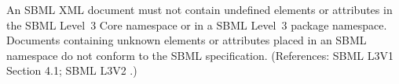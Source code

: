 An SBML XML document must not contain undefined elements or attributes in
the SBML Level~3 Core namespace or in a SBML Level~3 package namespace.
Documents containing unknown elements or attributes placed in an SBML
namespace do not conform to the SBML specification.  (References: SBML L3V1 Section 4.1; SBML L3V2
.)
